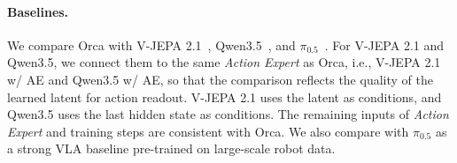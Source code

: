 \documentclass{llmxive}
\begin{document}
\paragraph{Baselines.} 
We compare Orca with V-JEPA 2.1~\citep{V-JEPA-2.1}, Qwen3.5~\citep{qwen35}, and $\pi_{0.5}$~\citep{pi0.5}. 
For V-JEPA 2.1 and Qwen3.5, we connect them to the same \textit{Action Expert} as Orca, i.e., V-JEPA 2.1 w/ AE and Qwen3.5 w/ AE, so that the comparison reflects the quality of the learned latent for action readout. V-JEPA 2.1 uses the latent as conditions, and Qwen3.5 uses the last hidden state as conditions. The remaining inputs of \textit{Action Expert} and training steps are consistent with Orca.
We also compare with $\pi_{0.5}$ as a strong VLA baseline pre-trained on large-scale robot data. 
\end{document}
